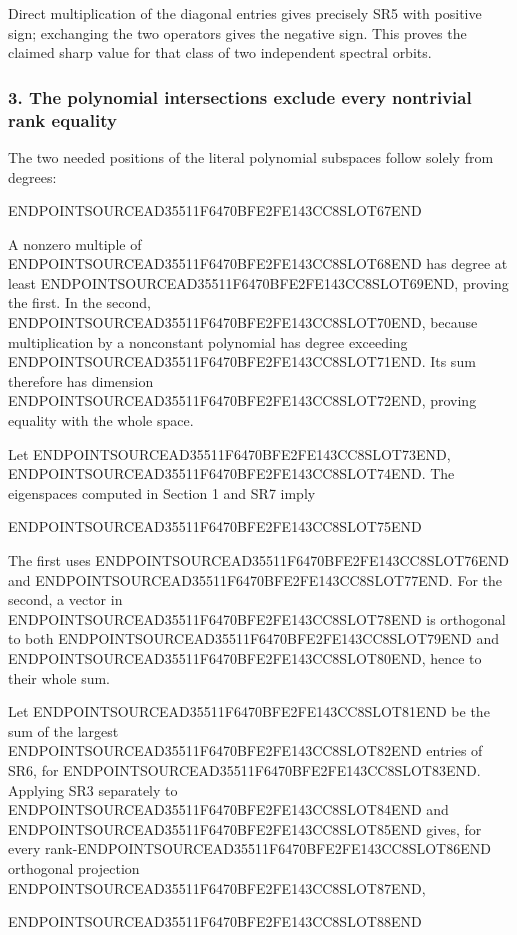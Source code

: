 Direct multiplication of the diagonal entries gives precisely SR5 with positive sign; exchanging the two operators gives the negative sign. This proves the claimed sharp value for that class of two independent spectral orbits.

\subsubsection{3. The polynomial intersections exclude every nontrivial rank equality}\label{endpoint-four_window_sharpness_review--the-polynomial-intersections-exclude-every-nontrivial-rank-equality}

The two needed positions of the literal polynomial subspaces follow solely from degrees:

ENDPOINTSOURCEAD35511F6470BFE2FE143CC8SLOT67END

A nonzero multiple of ENDPOINTSOURCEAD35511F6470BFE2FE143CC8SLOT68END has degree at least ENDPOINTSOURCEAD35511F6470BFE2FE143CC8SLOT69END, proving the first. In the second, ENDPOINTSOURCEAD35511F6470BFE2FE143CC8SLOT70END, because multiplication by a nonconstant polynomial has degree exceeding ENDPOINTSOURCEAD35511F6470BFE2FE143CC8SLOT71END. Its sum therefore has dimension ENDPOINTSOURCEAD35511F6470BFE2FE143CC8SLOT72END, proving equality with the whole space.

Let ENDPOINTSOURCEAD35511F6470BFE2FE143CC8SLOT73END, ENDPOINTSOURCEAD35511F6470BFE2FE143CC8SLOT74END. The eigenspaces computed in Section 1 and SR7 imply

ENDPOINTSOURCEAD35511F6470BFE2FE143CC8SLOT75END

The first uses ENDPOINTSOURCEAD35511F6470BFE2FE143CC8SLOT76END and ENDPOINTSOURCEAD35511F6470BFE2FE143CC8SLOT77END. For the second, a vector in ENDPOINTSOURCEAD35511F6470BFE2FE143CC8SLOT78END is orthogonal to both ENDPOINTSOURCEAD35511F6470BFE2FE143CC8SLOT79END and ENDPOINTSOURCEAD35511F6470BFE2FE143CC8SLOT80END, hence to their whole sum.

Let ENDPOINTSOURCEAD35511F6470BFE2FE143CC8SLOT81END be the sum of the largest ENDPOINTSOURCEAD35511F6470BFE2FE143CC8SLOT82END entries of SR6, for ENDPOINTSOURCEAD35511F6470BFE2FE143CC8SLOT83END. Applying SR3 separately to ENDPOINTSOURCEAD35511F6470BFE2FE143CC8SLOT84END and ENDPOINTSOURCEAD35511F6470BFE2FE143CC8SLOT85END gives, for every rank-ENDPOINTSOURCEAD35511F6470BFE2FE143CC8SLOT86END orthogonal projection ENDPOINTSOURCEAD35511F6470BFE2FE143CC8SLOT87END,

ENDPOINTSOURCEAD35511F6470BFE2FE143CC8SLOT88END

